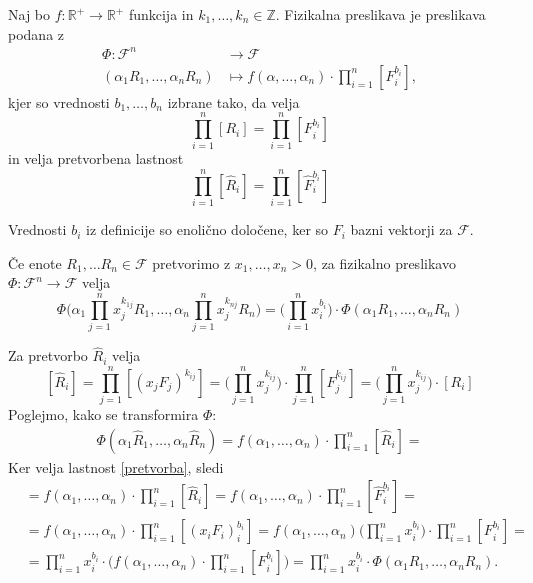 \documentclass[mat2, tisk]{fmfdelo}
\newcommand{\R}{\mathbb R}
\newcommand{\Z}{\mathbb Z}
\begin{document}
\begin{definicija}
Naj bo $f: \R^+ \rightarrow \R^+$ funkcija in $k_1, \dots, k_n \in \Z$.
Fizikalna preslikava je preslikava podana z 
\begin{align*}
\Phi: \mathcal{F}^n &\rightarrow \mathcal{F} \\
(\alpha_1 R_1, \dots, \alpha_n R_n) &\mapsto f(\alpha, \dots, \alpha_n)\cdot \prod_{i=1}^{n} [F_i^{b_i}],
\end{align*}
kjer so vrednosti $b_1, \dots, b_n$ izbrane tako, da velja 
$$
\prod_{i=1}^{n} [R_i] = \prod_{i=1}^{n} [F_i^{b_i}]
$$
in velja pretvorbena lastnost 
\begin{equation}
\label{pretvorba}
\prod_{i=1}^{n} [\hat{R}_i] = \prod_{i=1}^{n} [\hat{F}_i^{b_i}]
\end{equation}
\end{definicija}

\begin{opomba}
Vrednosti $b_i$ iz definicije so enolično določene, ker so $F_i$ 
bazni vektorji za $\mathcal{F}$.
\end{opomba}

\begin{lema}
\label{lema_pretvorba}
Če enote $R_1, \dots R_n \in \mathcal{F}$ pretvorimo z $x_1, \dots, x_n > 0$, za 
fizikalno preslikavo 
$\Phi: \mathcal{F}^n \rightarrow \mathcal{F}$ velja 
\begin{equation}
\Phi\Big(\alpha_1\prod_{j=1}^n x_j^{k_{1j}} R_1, \dots, \alpha_n \prod_{j=1}^n x_j^{k_{nj}} R_n\Big) = \Big(\prod_{i=1}^n x_i^{b_i}\Big)\cdot \Phi(\alpha_1 R_1, \dots, \alpha_n R_n)
\end{equation}
\end{lema}

\begin{dokaz}
Za pretvorbo $\hat{R}_i$ velja 
$$
[\hat{R}_i] = \prod_{j=1}^n [(x_j F_j)^{k_{ij}}] = \Big(\prod_{j=1}^n x_j^{k_{ij}}\Big)\cdot \prod_{j=1}^n [F_j^{k_{ij}}] = \Big(\prod_{j=1}^n x_j^{k_{ij}}\Big) \cdot [R_i]
$$
Poglejmo, kako se transformira $\Phi$:
\begin{align*}
\Phi(\alpha_1 \hat{R}_1, \dots, \alpha_n \hat{R}_n) = f(\alpha_1, \dots, \alpha_n) \cdot \prod_{i=1}^n [\hat{R}_i] = 
\end{align*}
Ker velja lastnost \ref{pretvorba}, sledi
\begin{align*}
&= f(\alpha_1, \dots, \alpha_n) \cdot \prod_{i=1}^n [\hat{R}_i] = f(\alpha_1, \dots, \alpha_n) \cdot \prod_{i=1}^n [\hat{F}_i^{b_i}] = \\
&= f(\alpha_1, \dots, \alpha_n) \cdot \prod_{i=1}^n [(x_i F_i)_i^{b_i}] = f(\alpha_1, \dots, \alpha_n) \Big(\prod_{i=1}^n x_i^{b_i}\Big) \cdot \prod_{i=1}^n [F_i^{b_i}] = \\
&= \prod_{i=1}^n x_i^{b_i} \cdot \Big(f(\alpha_1, \dots, \alpha_n)\cdot \prod_{i=1}^n [F_i^{b_i}] \Big) = \prod_{i=1}^n x_i^{b_i} \cdot \Phi(\alpha_1 R_1, \dots, \alpha_n R_n).
\end{align*}
\end{dokaz}
\end{document}
